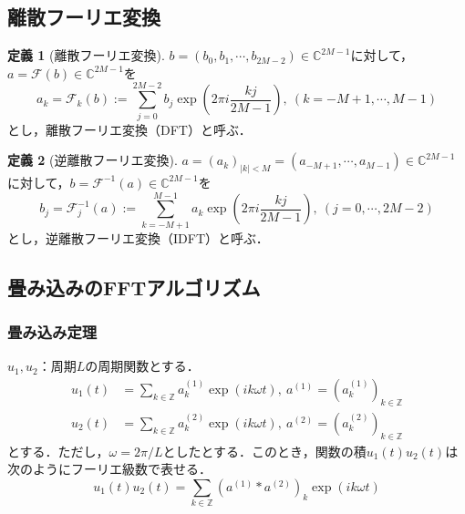 \documentclass[11pt,a4paper]{jsarticle}
\theoremstyle{definition}
\newtheorem{dfn}{定義}
\begin{document}
\subsection{離散フーリエ変換}
\begin{dfn}[離散フーリエ変換]
  $b=(b_0,b_1,\cdots,b_{2M-2}) \in \mathbb{C}^{2M-1}$に対して，$a=\mathcal{F}(b)\in \mathbb{C}^{2M-1}$を
  \begin{equation*}
    a_k = \mathcal{F}_k(b) := \sum_{j=0}^{2M-2} b_j \exp\left(2\pi i \frac{kj}{2M-1}\right),\ (k=-M+1,\cdots,M-1)
  \end{equation*}
  とし，離散フーリエ変換（DFT）と呼ぶ．
\end{dfn}

\begin{dfn}[逆離散フーリエ変換]
  $a=(a_{k})_{|k|<M} = (a_{-M+1},\cdots,a_{M-1}) \in \mathbb{C}^{2M-1}$に対して，$b=\mathcal{F}^{-1}(a)\in \mathbb{C}^{2M-1}$を
  \begin{equation*}
    b_j = \mathcal{F}^{-1}_j(a) := \sum_{k=-M+1}^{M-1} a_k \exp\left(2\pi i \frac{kj}{2M-1}\right),\ (j=0,\cdots,2M-2)
  \end{equation*}
  とし，逆離散フーリエ変換（IDFT）と呼ぶ．
\end{dfn}

\subsection{畳み込みのFFTアルゴリズム}
\subsubsection{畳み込み定理}
$u_1,u_2$：周期$L$の周期関数とする．
\begin{align*}
  u_1(t) & = \sum_{k\in\mathbb{Z}} a_k^{(1)} \exp\left( ik\omega t \right) ,\ a^{(1)}= \left( a_k^{(1)} \right)_{k\in\mathbb{Z}} \\
  u_2(t) & = \sum_{k\in\mathbb{Z}} a_k^{(2)} \exp\left( ik\omega t \right) ,\ a^{(2)}= \left( a_k^{(2)} \right)_{k\in\mathbb{Z}}
\end{align*}
とする．ただし，$\omega = 2\pi / L$としたとする．このとき，関数の積$u_1(t)u_2(t)$は次のようにフーリエ級数で表せる．
\begin{equation*}
  u_1(t)u_2(t) = \sum_{k\in\mathbb{Z}} \left(a^{(1)} * a^{(2)}\right)_k \exp{(ik   \omega t)}
\end{equation*}
\end{document}
